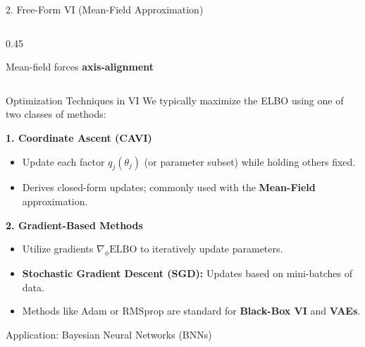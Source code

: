 \documentclass[aspectratio=169]{beamer}
\begin{document}
\begin{frame}{2. Free-Form VI (Mean-Field Approximation)}
\begin{columns}
\begin{column}{0.45\textwidth}
            \vspace{0.2em}
            \footnotesize{Mean-field forces \textbf{axis-alignment}}
        \end{column}
    \end{columns}
\end{frame}

\begin{frame}{Optimization Techniques in VI}
  We typically maximize the ELBO using one of two classes of methods:

  \vspace{0.4em}
  \textbf{1. Coordinate Ascent (CAVI)}
  \begin{itemize}
    \item Update each factor $q_j(\theta_j)$ (or parameter subset) while holding others fixed.
    \item Derives closed-form updates; commonly used with the \textbf{Mean-Field} approximation.
  \end{itemize}

  \vspace{0.4em}
  \textbf{2. Gradient-Based Methods}
  \begin{itemize}
    \item Utilize gradients $\nabla_{\phi} \mathrm{ELBO}$ to iteratively update parameters.
    \item \textbf{Stochastic Gradient Descent (SGD):} Updates based on mini-batches of data.
    \item Methods like Adam or RMSprop are standard for \textbf{Black-Box VI} and \textbf{VAEs}.
  \end{itemize}
\end{frame}

\begin{frame}[plain]
    \centering
    \vfill
    {Application: Bayesian Neural Networks (BNNs) \par}
    \vfill
\end{frame}
\end{document}
